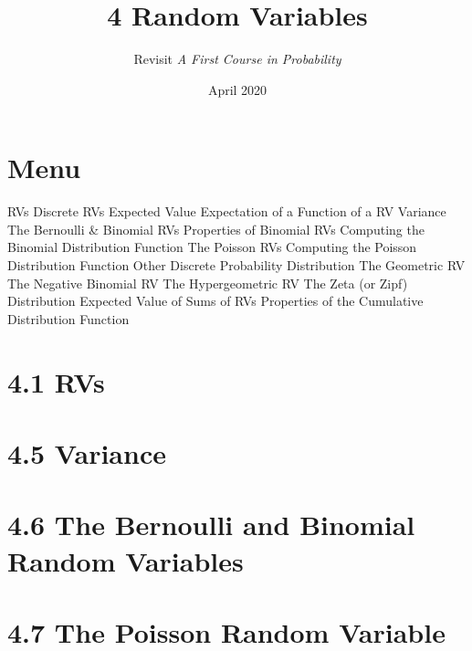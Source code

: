 \documentclass{article}
\title{4 Random Variables}
\author{Revisit \emph{A First Course in Probability}}
\date{April 2020}
\begin{document}
\maketitle

\section*{Menu}
\begin{outline}[enumerate]
    \1  RVs
    \1  Discrete RVs
    \1  Expected Value
    \1  Expectation of a Function of a RV
    \1  Variance
    \1  The Bernoulli & Binomial RVs
        \2 Properties of Binomial RVs
        \2 Computing the Binomial Distribution Function
    \1  The Poisson RVs 
        \2 Computing the Poisson Distribution Function
    \1  Other Discrete Probability Distribution
        \2 The Geometric RV
        \2 The Negative Binomial RV
        \2 The Hypergeometric RV
        \2 The Zeta (or Zipf) Distribution 
    \1  Expected Value of Sums of RVs
    \1  Properties of the Cumulative Distribution Function 
\end{outline}


\section*{4.1 RVs}
\section*{4.5 Variance}
\section*{4.6 The Bernoulli and Binomial Random Variables}
\section*{4.7 The Poisson Random Variable}





\end{document}

